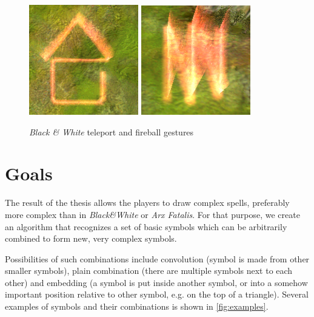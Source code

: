 \begin{description}
\begin{figure}
\centering
\includegraphics[width=.3\linewidth]{ext/gestureteleport.png}
\quad
\includegraphics[width=.3\linewidth]{ext/gesturefireball.png}
\caption{\emph{Black \& White} teleport and fireball gestures}
\label{fig:blackwhite}
\end{figure}

\end{description}

\section{Goals}

The result of the thesis allows the players to draw complex spells, preferably more complex than in \emph{Black\&White} or \emph{Arx Fatalis}. For that purpose, we create an algorithm that recognizes a set of basic symbols which can be arbitrarily combined to form new, very complex symbols.

Possibilities of such combinations include convolution (symbol is made from other smaller symbols), plain combination (there are multiple symbols next to each other) and embedding (a symbol is put inside another symbol, or into a somehow important position relative to other symbol, e.g. on the top of a triangle). Several examples of symbols and their combinations is shown in \cref{fig:examples}.

